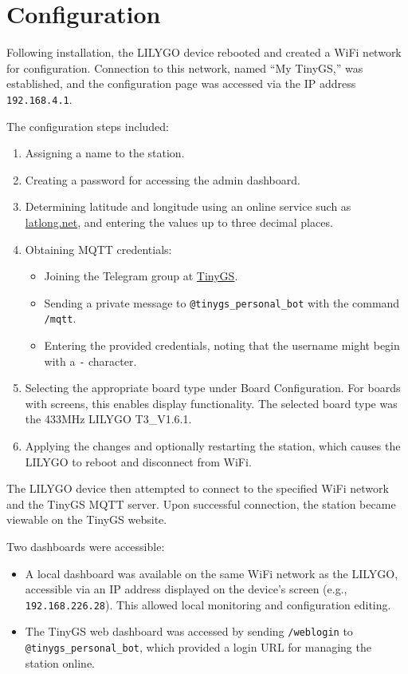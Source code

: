 \documentclass{article}
\begin{document}
\section{Configuration}
Following installation, the LILYGO device rebooted and created a WiFi network for configuration. Connection to this network, named ``My TinyGS,'' was established, and the configuration page was accessed via the IP address \texttt{192.168.4.1}.

The configuration steps included:
\begin{enumerate}
    \item Assigning a name to the station.
    \item Creating a password for accessing the admin dashboard.
    \item Determining latitude and longitude using an online service such as \href{http://latlong.net}{latlong.net}, and entering the values up to three decimal places.
    \item Obtaining MQTT credentials:
    \begin{itemize}
        \item Joining the Telegram group at \href{https://tinygs.com}{TinyGS}.
        \item Sending a private message to \texttt{@tinygs\_personal\_bot} with the command \texttt{/mqtt}.
        \item Entering the provided credentials, noting that the username might begin with a \texttt{-} character.
    \end{itemize}
    \item Selecting the appropriate board type under Board Configuration. For boards with screens, this enables display functionality. The selected board type was the 433MHz LILYGO T3\_V1.6.1.
    \item Applying the changes and optionally restarting the station, which causes the LILYGO to reboot and disconnect from WiFi.
\end{enumerate}

The LILYGO device then attempted to connect to the specified WiFi network and the TinyGS MQTT server. Upon successful connection, the station became viewable on the TinyGS website.

Two dashboards were accessible:
\begin{itemize}
    \item A local dashboard was available on the same WiFi network as the LILYGO, accessible via an IP address displayed on the device's screen (e.g., \texttt{192.168.226.28}). This allowed local monitoring and configuration editing.
    \item The TinyGS web dashboard was accessed by sending \texttt{/weblogin} to \texttt{@tinygs\_personal\_bot}, which provided a login URL for managing the station online.
\end{itemize}
\end{document}
